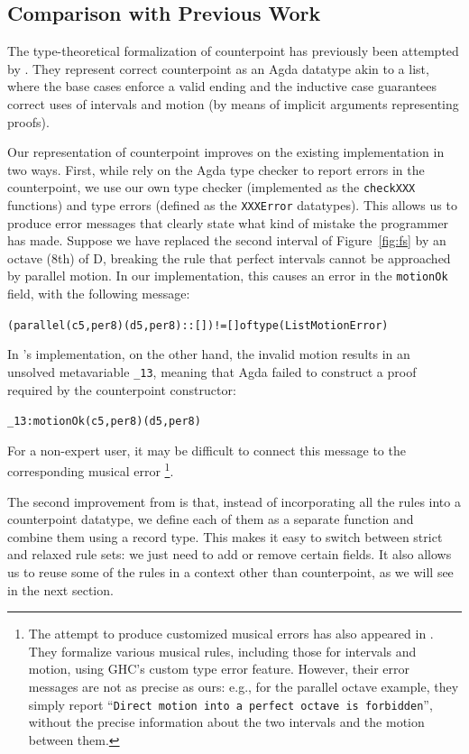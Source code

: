 \subsection{Comparison with Previous Work}
\label{sec:cp:comp}

The type-theoretical formalization of counterpoint has previously
been attempted by \citet{cong-cp}.
They represent correct counterpoint as an Agda datatype akin to
a list, where the base cases enforce a valid ending and the inductive
case guarantees correct uses of intervals and motion (by means of
implicit arguments representing proofs).

Our representation of counterpoint improves on the existing
implementation in two ways.
First, while \citet{cong-cp} rely on the Agda type checker to report
errors in the counterpoint, we use our own type checker (implemented
as the \texttt{checkXXX} functions) and type errors (defined as the
\texttt{XXXError} datatypes).
This allows us to produce error messages that clearly state what
kind of mistake the programmer has made.
Suppose we have replaced the second interval of Figure~\ref{fig:fs} by
an octave (8th) of D, breaking the rule that perfect intervals cannot
be approached by parallel motion.
In our implementation, this causes an error in the \texttt{motionOk}
field, with the following message:

\begin{alltt}
(parallel (c 5 , per8) (d 5 , per8) :: []) != [] of type (List MotionError)
\end{alltt}

\noindent In \citet{cong-cp}'s implementation, on the other hand,
the invalid motion results in an unsolved metavariable \texttt{\_13},
meaning that Agda failed to construct a proof required by the
counterpoint constructor:

\begin{alltt}
\_13 : motionOk (c 5 , per8) (d 5 , per8)
\end{alltt}

\noindent For a non-expert user, it may be difficult to connect
this message to the corresponding musical error \footnote{
  The attempt to produce customized musical errors has also
  appeared in \citet{szamozvancev-welltyped}.
  They formalize various musical rules, including those for
  intervals and motion, using GHC's custom type error feature.
  However, their error messages are not as precise as ours:
  e.g., for the parallel octave example, they simply report
  ``\texttt{Direct motion into a perfect octave is forbidden}'',
  without the precise information about the two intervals and
  the motion between them.}.

The second improvement from \citet{cong-cp} is that, instead of
incorporating all the rules into a counterpoint datatype, we define
each of them as a separate function and combine them using a
record type.
This makes it easy to switch between strict and relaxed rule sets:
we just need to add or remove certain fields.
It also allows us to reuse some of the rules in a context other than
counterpoint, as we will see in the next section.